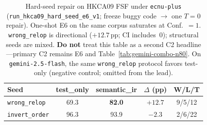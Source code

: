 \begin{table}[t]
  \centering
  \caption{Hard-seed repair on HKCA09 FSF under \texttt{ecnu-plus}
    (\texttt{run\_hkca09\_hard\_seed\_e6\_v1}; freeze buggy code $\rightarrow$
    one $T{=}0$ repair).
    One-shot E6 on the same corpus saturates at Conf.\ $=1$.
    \texttt{wrong\_relop} is directional (${+}12.7$\,pp; CI includes~0);
    structural seeds are mixed.
    \textbf{Do not} treat this table as a second C2 headline---primary C2
    remains E6 and Table~\ref{tab:gemini-combo-n80}.
    On \texttt{gemini-2.5-flash}, the same \texttt{wrong\_relop} protocol
    favors test-only (negative control; omitted from the lead).}
  \label{tab:hkca09-hard-seed}
  \footnotesize
  \begin{tabular}{lcccc}
    \toprule
    Seed & test\_only & semantic\_ir & $\Delta$ (pp) & W/L/T \\
    \midrule
    \texttt{wrong\_relop} & 69.3 & \textbf{82.0} & $+12.7$ & 9/5/12 \\
    \texttt{invert\_order} & 96.3 & 93.9 & $-2.3$ & 2/6/22 \\
    \bottomrule
  \end{tabular}
\end{table}
